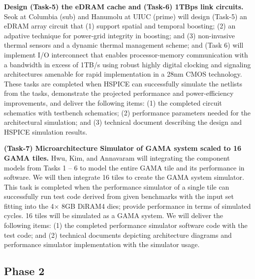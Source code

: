 \vspace{3pt}
\noindent
\textbf{Design (Task-5) the eDRAM cache and (Task-6) 1TBps link circuits.}
Seok at Columbia (sub) and Hanumolu at UIUC (prime) will design 
(Task-5) an eDRAM array circuit that (1) support spatial and temporal boosting; (2) an adpative technique for power-grid integrity in boosting; and (3) non-invasive thermal sensors and a dynamic thermal management scheme; and 
(Task 6) will implement I/O interconnect that enables processor-memory communication with a bandwidth in excess of 1TB/s using robust highly digital clocking and signaling architectures amenable for rapid implementation in a 28nm CMOS technology.
These tasks are completed when HSPICE can successfully simulate the netlists from the tasks, demonstrate the projected performance and power-efficiency improvements, and deliver the following items:
(1) the completed circuit schematics with testbench schematics; (2) performance parameters needed for the architectural simulation; and (3) technical document describing the design and HSPICE simulation results.


\vspace{3pt}
\noindent
\textbf{(Task-7) Microarchitecture Simulator of GAMA system scaled to 16 GAMA tiles.}
Hwu, Kim, and Annavaram will integrating the component models from Tasks 1 -- 6 to model the entire GAMA tile and its performance in software. We will then integrate 16 tiles to create the GAMA system simulator. 
This task is completed when the performance simulator of a single tile can successfully run test code derived from given benchmarks with the input set fitting into the 4$\times$ 8GB DiRAM4 dies; provide performance in terms of simulated cycles. 16 tiles will be simulated as a GAMA system. We will deliver the following items:
(1) the completed performance simulator software code with the test code; and (2) technical documents depicting architecture diagrams and performance simulator implementation with the simulator usage.


\subsection{Phase 2}
%

